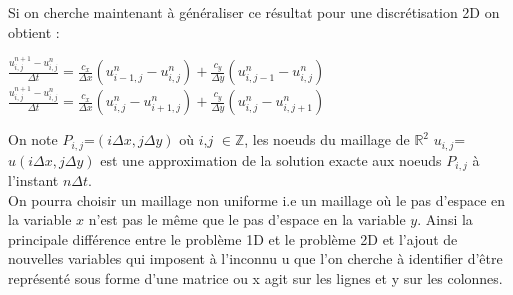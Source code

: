 \documentclass[12pt]{article}
\begin{document}
\\
\\Si on cherche maintenant à généraliser ce résultat pour une discrétisation 2D on obtient :
\\
\begin{center}
         $\displaystyle\frac{u_{i,j}^{n+1}-u_{i,j}^{n}}{\Delta t}=\frac{c_x}{\Delta x}(u_{i-1,j}^n-u_{i,j}^n)+\frac{c_y}{\Delta y}(u_{i,j-1}^n-u_{i,j}^n)$
        \\
        $ \displaystyle\frac{u_{i,j}^{n+1}-u_{i,j}^{n}}{\Delta t}=\frac{c_x}{\Delta x}(u_{i,j}^n-u_{i+1,j}^n)+\frac{c_y}{\Delta y}(u_{i,j}^n-u_{i,j+1}^n)$
\end{center}
On note $P_{i,j}$=$(i \Delta x,j \Delta y)$ où $i$,$j$ $\in\mathbb{Z}$, les noeuds du maillage de $\mathbb{R}^2$  $u_{i,j}$=$u(i \Delta x,j \Delta y)$ est une approximation de la solution exacte aux noeuds $P_{i,j}$ à l'instant $n\Delta t$.
\\On pourra choisir un maillage non uniforme i.e un maillage où le pas d'espace en la variable $x$ n'est pas le même que le pas d'espace en la variable $y$.
Ainsi la principale différence entre le problème 1D et le problème 2D et l'ajout de nouvelles variables qui imposent à l'inconnu u que l'on cherche à identifier d'être représenté sous forme d'une matrice ou x agit sur les lignes et y sur les colonnes.
\end{document}
